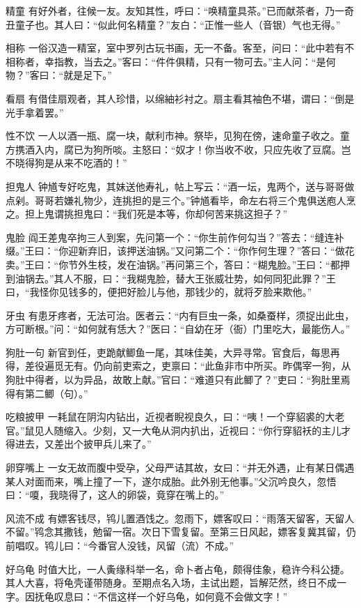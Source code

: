 \documentclass[12pt,UTF8]{ctexbook}
\begin{document}
精童
有好外者，往候一友。友知其性，呼曰：“唤精童具茶。”已而献茶者，乃一奇丑童子也。其人曰：“似此何名精童？”友白：“正惟一些人（音银）气也无得。”

相称
一俗汉造一精室，室中罗列古玩书画，无一不备。客至，问曰：“此中若有不相称者，幸指教，当去之。”客曰：“件件俱精，只有一物可去。”主人问：“是何物？”客曰：“就是足下。”

看扇
有借佳扇观者，其人珍惜，以绵紬衫衬之。扇主看其袖色不堪，谓曰：“倒是光手拿着罢。”

性不饮
一人以酒一瓶、腐一块，献利市神。祭毕，见狗在傍，速命童子收之。童方携酒入内，腐已为狗所啖。主怒曰：“奴才！你当收不收，只应先收了豆腐。岂不晓得狗是从来不吃酒的！”

担鬼人
钟馗专好吃鬼，其妹送他寿礼，帖上写云：“酒一坛，鬼两个，送与哥哥做点剁。哥哥若嫌礼物少，连挑担的是三个。”钟馗看毕，命左右将三个鬼俱送庖人烹之。担上鬼谓挑担鬼曰：“我们死是本等，你却何苦来挑这担子？”

鬼脸
阎王差鬼卒拘三人到案，先问第一个：“你生前作何勾当？”答去：“缝连补缀。”王曰：“你迎新弃旧，该押送油锅。”又问第二个：“你作何生理？”答曰：“做花卖。”王曰：“你节外生枝，发在油锅。”再问第三个，答曰：“糊鬼脸。”王曰：“都押到油锅去。”其人不服，曰：“我糊鬼脸，替大王张威壮势，如何同犯此罪？”王曰，“我怪你见钱多的，便把好脸儿与他，那钱少的，就将歹脸来欺他。”

牙虫
有患牙疼者，无法可治。医者云：“内有巨虫一条，如桑蚕样，须捉出此虫，方可断根。”问：“如何就有恁大？”医曰：“自幼在牙（衙）门里吃大，最能伤人。”

狗肚一句
新官到任，吏跪献鲫鱼一尾，其味佳美，大异寻常。官食后，每思再得，差役遍觅无有。仍向前吏索之，吏禀曰：“此鱼非市中所买。昨偶宰一狗，从狗肚中得者，以为异品，故敢上献。”官曰：“难道只有此鲫了？”吏曰：“狗肚里焉得有第二鲫（句）。”

吃粮披甲
一耗鼠在阴沟内钻出，近视者睨视良久，曰：“咦！一个穿貂裘的大老官。”鼠见人随缩入。少刻，又一大龟从洞内扒出，近视曰：“你行穿貂袄的主儿才得进去，又差出个披甲兵儿来了。”

卵穿嘴上
一女无故而腹中受孕，父母严诘其故，女曰：“并无外遇，止有某日偶遇某人对面而来，嘴上撞了一下，遂尔成胎。此外别无他事。”父沉吟良久，忽悟曰：“嗄，我晓得了，这人的卵袋，竟穿在嘴上的。”

风流不成
有嫖客钱尽，鸨儿置酒饯之。忽雨下，嫖客叹曰：“雨落天留客，天留人不留。”鸨念其撒钱，勉留一宿。次日下雪复留。至第三日风起，嫖客复冀其留，仍前唱叹。鸨儿曰：“今番官人没钱，风留（流）不成。”

好乌龟
时值大比，一人夤缘科举一名，命卜者占龟，颇得佳象，稳许今科公捷。其人大喜，将龟壳谨带随身。至期点名入场，主试出题，旨解茫然，终日不成一字。因抚龟叹息曰：“不信这样一个好乌龟，如何竟不会做文字！”
\end{document}
